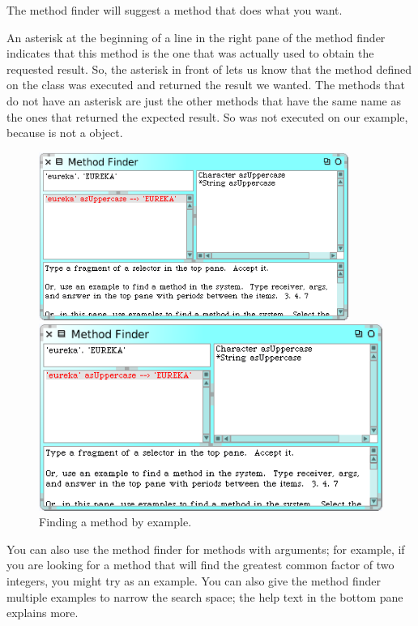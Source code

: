 \documentclass[a4paper,10pt,twoside]{book}
\begin{document}
\noindent
The method finder will suggest a method that does what you want.

An asterisk at the beginning of a line in the right pane of the method finder indicates that this method is the one that was actually used to obtain the requested result. 
So, the asterisk in front of  lets us know that the method  defined on the class  was executed and returned the result we wanted. The methods that do not have an asterisk are just the other methods that have the same name as the ones that returned the expected result. So  was not executed on our example, because  is not a  object.

\begin{figure}[hbt]
\ifluluelse
	{\centerline {\includegraphics[width=0.9\textwidth]{MethodFinder-example1}}}
	{\centerline {\includegraphics[scale=0.7]{MethodFinder-example1}}}
\caption{Finding a method by example.
\label{fig:methodFinder-example1}}
\end{figure}

You can also use the method finder for methods with arguments; for example, if you are looking for a method that will find the greatest common factor of two integers, you might try  as an example.  You can also give the method finder multiple examples to narrow the search space; the help text in the bottom pane explains more.
\end{document}

